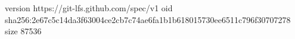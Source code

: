 version https://git-lfs.github.com/spec/v1
oid sha256:2e67c5c14da3f63004ce2cb7c74ae6fa1b1b618015730ee6511c796f30707278
size 87536
